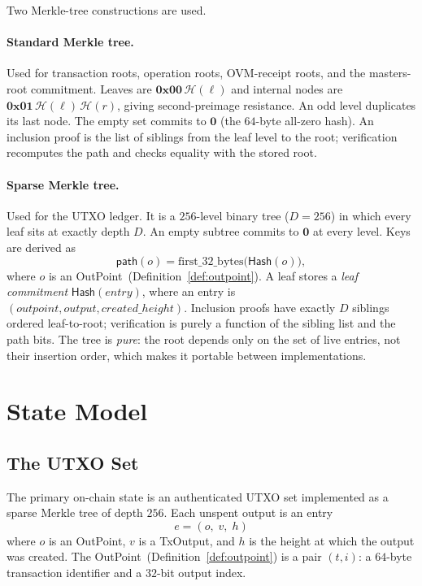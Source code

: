 \documentclass[11pt,a4paper]{article}
\theoremstyle{definition}
\newcommand{\outpoint}{\textsf{OutPoint}}
\newcommand{\hash}{\mathcal{H}}
\newcommand{\hashvalue}{\mathsf{Hash}}
\newcommand{\emptyroot}{\mathbf{0}}
\begin{document}
Two Merkle-tree constructions are used.

\paragraph{Standard Merkle tree.} Used for transaction roots, operation roots,
OVM-receipt roots, and the masters-root commitment.  Leaves are
$\mathbf{0x00}\,\hash(\ell)$ and internal nodes are
$\mathbf{0x01}\,\hash(\ell)\,\hash(r)$, giving second-preimage resistance.
An odd level duplicates its last node.  The empty set commits to
$\emptyroot$ (the $64$-byte all-zero hash).  An inclusion proof is the list of
siblings from the leaf level to the root; verification recomputes the path and
checks equality with the stored root.

\paragraph{Sparse Merkle tree.}
Used for the UTXO ledger.  It is a $256$-level binary tree
($D = 256$) in which every leaf sits at exactly depth $D$.  An empty subtree
commits to $\emptyroot$ at every level.  Keys are derived as
\[
\mathsf{path}(o) = \mathrm{first\_32\_bytes}\bigl(\hashvalue(o)\bigr),
\]
where $o$ is an \outpoint\ (Definition~\ref{def:outpoint}).  A leaf stores a
\emph{leaf commitment} $\hashvalue(\mathit{entry})$, where an entry is
$(\mathit{outpoint}, \mathit{output}, \mathit{created\_height})$.  Inclusion
proofs have exactly $D$ siblings ordered leaf-to-root; verification is purely a
function of the sibling list and the path bits.  The tree is \emph{pure}: the
root depends only on the set of live entries, not their insertion order, which
makes it portable between implementations.

\section{State Model}
\label{sec:state}

\subsection{The UTXO Set}

The primary on-chain state is an authenticated UTXO set implemented as a sparse
Merkle tree of depth $256$.  Each unspent output is an entry
\[
e = (o,\; v,\; h)
\]
where $o$ is an \outpoint, $v$ is a TxOutput, and $h$ is the height at which the
output was created.  The \outpoint\ (Definition~\ref{def:outpoint}) is a pair
$(t, i)$: a $64$-byte transaction identifier and a $32$-bit output index.
\end{document}
